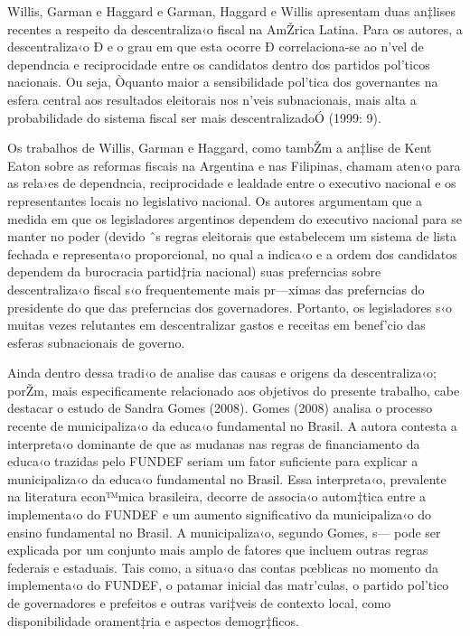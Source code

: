 \documentclass[a4paper, 12pt]{article}
\begin{document}
Willis, Garman e Haggard \citeyear{willis_politics_1999} e Garman, Haggard e Willis \citeyear{garman_fiscal_2001} apresentam duas an‡lises recentes a respeito da descentraliza‹o fiscal na AmŽrica Latina. Para os autores, a descentraliza‹o Ð e o grau em que esta ocorre Ð correlaciona-se ao n’vel de dependncia e reciprocidade entre os candidatos dentro dos partidos pol’ticos nacionais. Ou seja, Òquanto maior a sensibilidade pol’tica dos governantes na esfera central aos resultados eleitorais nos n’veis subnacionais, mais alta a probabilidade do sistema fiscal ser mais descentralizadoÓ (1999: 9). 

Os trabalhos de Willis, Garman e Haggard, como tambŽm a an‡lise de Kent Eaton \citeyear{eaton_decentralization_2000} sobre as reformas fiscais na Argentina e nas Filipinas, chamam aten‹o para as rela›es de dependncia, reciprocidade e lealdade entre o executivo nacional e os representantes locais no legislativo nacional. Os autores argumentam que a medida em que os legisladores argentinos dependem do executivo nacional para se manter no poder (devido ˆs regras eleitorais que estabelecem um sistema de lista fechada e representa‹o proporcional, no qual a indica‹o e a ordem dos candidatos dependem da burocracia partid‡ria nacional) suas preferncias sobre descentraliza‹o fiscal s‹o frequentemente mais pr—ximas das preferncias do presidente do que das preferncias dos governadores. Portanto, os legisladores s‹o muitas vezes relutantes em descentralizar gastos e receitas em benef’cio das esferas subnacionais de governo.

Ainda dentro dessa tradi‹o de analise das causas e origens da descentraliza‹o; porŽm, mais especificamente relacionado aos objetivos do presente trabalho, cabe destacar o estudo de Sandra Gomes (2008). Gomes (2008) analisa o processo recente de municipaliza‹o da educa‹o fundamental no Brasil. A autora contesta a interpreta‹o dominante de que as mudanas nas regras de financiamento da educa‹o trazidas pelo FUNDEF seriam um fator suficiente para explicar a municipaliza‹o da educa‹o fundamental no Brasil. Essa interpreta‹o, prevalente na literatura econ™mica brasileira, decorre de associa‹o autom‡tica entre a implementa‹o do FUNDEF e um aumento significativo da municipaliza‹o do ensino fundamental no Brasil. A municipaliza‹o, segundo Gomes, s— pode ser explicada por um conjunto mais amplo de fatores que incluem outras regras federais e estaduais. Tais como, a situa‹o das contas pœblicas no momento da implementa‹o do FUNDEF, o patamar inicial das matr’culas, o partido pol’tico de governadores e prefeitos e outras vari‡veis de contexto local, como disponibilidade orament‡ria e aspectos demogr‡ficos.
\end{document}

